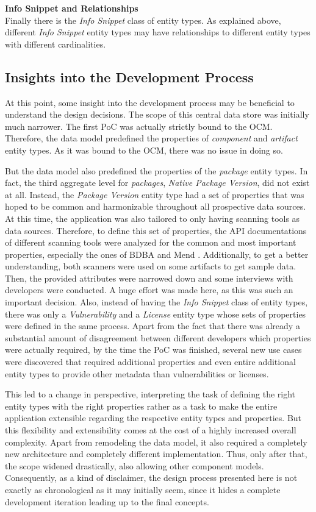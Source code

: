 \noindent\textbf{Info Snippet and Relationships}\\
Finally there is the \emph{Info Snippet} class of entity types. As explained above, different \emph{Info Snippet} entity types may have relationships to different entity types with different cardinalities.

\subsection{Insights into the Development Process} \label{sec:Insights into the Development Process}
At this point, some insight into the development process may be beneficial to understand the design decisions. The scope of this central data store was initially much narrower. The first PoC was actually strictly bound to the OCM. Therefore, the data model predefined the properties of \emph{component} and \emph{artifact} entity types. As it was bound to the OCM, there was no issue in doing so.\par
But the data model also predefined the properties of the \emph{package} entity types. In fact, the third aggregate level for \emph{packages}, \emph{Native Package Version}, did not exist at all. Instead, the \emph{Package Version} entity type had a set of properties that was hoped to be common and harmonizable throughout all prospective data sources. At this time, the application was also tailored to only having scanning tools as data sources. Therefore, to define this set of properties, the API documentations of different scanning tools were analyzed for the common and most important properties, especially the ones of BDBA and Mend \cite{MendAPI}. Additionally, to get a better understanding, both scanners were used on some artifacts to get sample data. Then, the provided attributes were narrowed down and some interviews with developers were conducted. A huge effort was made here, as this was such an important decision. Also, instead of having the \emph{Info Snippet} class of entity types, there was only a \emph{Vulnerability} and a \emph{License} entity type whose sets of properties were defined in the same process. Apart from the fact that there was already a substantial amount of disagreement between different developers which properties were actually required, by the time the PoC was finished, several new use cases were discovered that required additional properties and even entire additional entity types to provide other metadata than vulnerabilities or licenses.\par
This led to a change in perspective, interpreting the task of defining the right entity types with the right properties rather as a task to make the entire application extensible regarding the respective entity types and properties. But this flexibility and extensibility comes at the cost of a highly increased overall complexity. Apart from remodeling the data model, it also required a completely new architecture and completely different implementation. Thus, only after that, the scope widened drastically, also allowing other component models. Consequently, as a kind of disclaimer, the design process presented here is not exactly as chronological as it may initially seem, since it hides a complete development iteration leading up to the final concepts.

